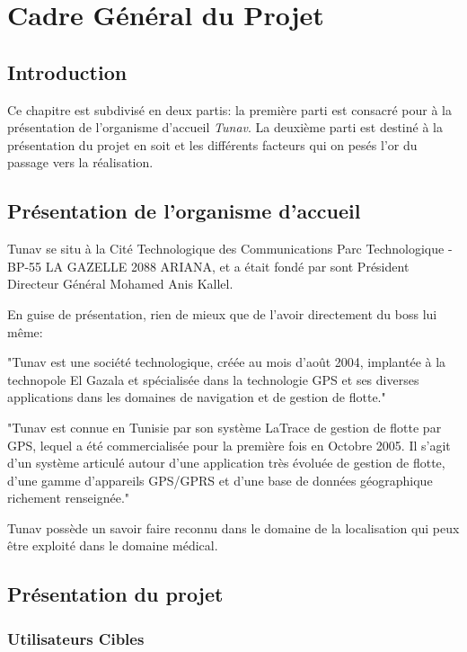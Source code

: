 
\chapter{Cadre Général du Projet}
\section{Introduction}
Ce chapitre est subdivisé en deux partis: la première parti est consacré pour à la présentation de l'organisme d'accueil \textit{Tunav}. La deuxième parti est destiné à la présentation du projet en soit et les différents facteurs qui on pesés l'or du passage vers la réalisation.

\section{Présentation de l'organisme d'accueil}  

Tunav se situ à la Cité Technologique des Communications Parc Technologique
-BP-55 LA GAZELLE 2088 ARIANA, et a était fondé par sont Président Directeur
Général Mohamed Anis Kallel.

En guise de présentation, rien de mieux que de l'avoir directement du boss lui
même\cite{index_tunisie}:

"Tunav est une société technologique, créée au mois d'août 2004, implantée à la
technopole El Gazala et spécialisée dans la technologie GPS et ses diverses
applications dans les domaines de navigation et de gestion de flotte."

"Tunav est connue en Tunisie par son système \og{}LaTrace\fg{} de gestion de
flotte par GPS, lequel a été commercialisée pour la première fois en Octobre
2005. Il s'agit d'un système articulé autour d'une application très évoluée de
gestion de flotte, d'une gamme d'appareils GPS/GPRS et d'une base de données
géographique richement renseignée."

Tunav possède un savoir faire reconnu dans le domaine de la localisation qui peux être exploité dans le domaine médical.

\section{Présentation du projet}

\subsection{Utilisateurs Cibles}

